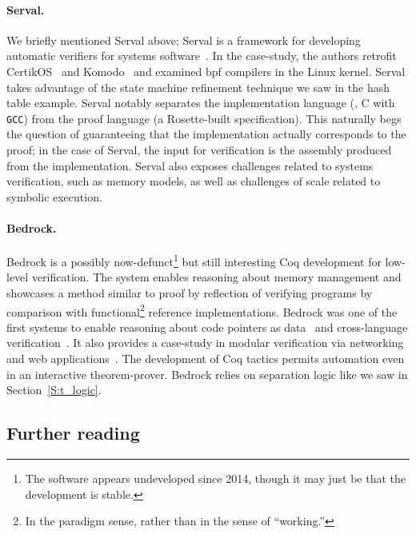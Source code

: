 \paragraph{Serval.} We briefly mentioned Serval above; Serval is a framework for
developing automatic verifiers for systems software~\cite{Nelson_2019}. In the
case-study, the authors retrofit CertikOS~\cite{199344} and
Komodo~\cite{Ferraiuolo_2017} and examined \gls{bpf} compilers in the Linux
kernel. Serval takes advantage of the state machine refinement technique we saw
in the hash table example. Serval notably separates the implementation language
(\eg, C with \texttt{GCC}) from the proof language (a Rosette-built
specification). This naturally begs the question of guaranteeing that the
implementation actually corresponds to the proof; in the case of Serval, the
input for verification is the assembly produced from the implementation. Serval
also exposes challenges related to systems verification, such as memory models,
as well as challenges of scale related to symbolic execution.

\paragraph{Bedrock.} Bedrock is a possibly now-defunct\footnote{The software
appears undeveloped since 2014, though it may just be that the development is
stable.} but still interesting Coq development for low-level verification. The
system enables reasoning about memory management and showcases a method similar
to proof by reflection of verifying programs by comparison with
functional\footnote{In the paradigm sense, rather than in the sense of
``working.''} reference implementations. Bedrock was one of the first systems to
enable reasoning about code pointers as data~\cite{Chlipala_2011} and
cross-language verification~\cite{Wang_2014}. It also provides a case-study in
modular verification via networking and web applications~\cite{Chlipala_2015}.
The development of Coq tactics permits automation even in an interactive
theorem-prover. Bedrock relies on separation logic like we saw in
Section~\ref{S:t_logic}.

\subsection{Further reading}\label{S:ex_reading}

